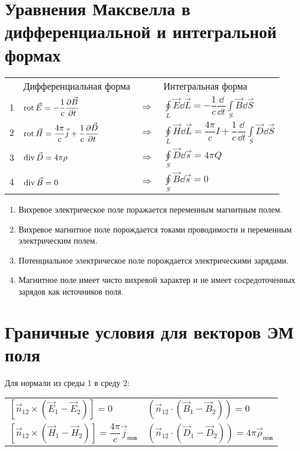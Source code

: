 \begin{multicols*}{2}
		\section{Уравнения Максвелла в дифференциальной и интегральной формах}
        \begin{tabular}{c|lcl|}
            {} & {Дифференциальная форма} & {} & {Интегральная форма} \\
            {1} & {$\operatorname{rot}\vec{E}=-\dfrac1c\dfrac{\partial{\vec{B}}}{\partial{t}}$} & {$\Rightarrow$} & { $\oint\limits_L\vec{E}\dd\vec{L}=-\dfrac1c\dfrac\dd{\dd{t}}\int\limits_S\vec{B}\dd{\vec{S}}$} \\

            {2} & {$\operatorname{rot}\vec{H} = \dfrac{4\pi}{c}\vec{j} + \dfrac1c\dfrac{\partial{\vec{D}}}{\partial{t}}$} & {$\Rightarrow$} & {$\oint\limits_L\vec{H}\dd\vec{L} = \dfrac{4\pi}{c}I+\dfrac1c\dfrac\dd{\dd{t}}\int\limits_S\vec{D}\dd{\vec{S}}$} \\

            {3} & {$\operatorname{div}\vec{D}=4\pi \rho$} & {$\Rightarrow$} & {$\oint\limits_S\vec{D}\dd{\vec{s}}=4\pi Q$} \\

            {4} & {$\operatorname{div}\vec{B}=0$} & {$\Rightarrow$} & {$\oint\limits_S\vec{B}\dd{\vec{s}}=0$}
         \end{tabular}
         \begin{enumerate}
             \item {Вихревое электрическое поле поражается переменным магнитным полем.}
             \item {Вихревое магнитное поле порождается токами проводимости и переменным электрическим полем.}
             \item {Потенциальное электрическое поле порождается электрическими зарядами.}
             \item {Магнитное поле имеет чисто вихревой характер и не имеет сосредоточенных зарядов как источников поля.}
         \end{enumerate}

		\section{Граничные условия для векторов ЭМ поля}
        Для нормали из среды 1 в среду 2: \\
        \begin{tabular}{l|l}
            $\left[\vec{n}_{12}\times(\vec E_1-\vec E_2)\right]=0$ &
            $\left(\vec{n}_{12}\cdot(\vec B_1-\vec B_2)\right)=0$ \\
            $\left[\vec{n}_{12}\times(\vec H_1-\vec H_2)\right]=\dfrac{4\pi}{c}\vec j_{\text{пов}}$ &
            $\left(\vec{n}_{12}\cdot(\vec D_1-\vec D_2)\right)=4\pi\vec \rho_{\text{пов}}$
        \end{tabular}


\end{multicols*}
